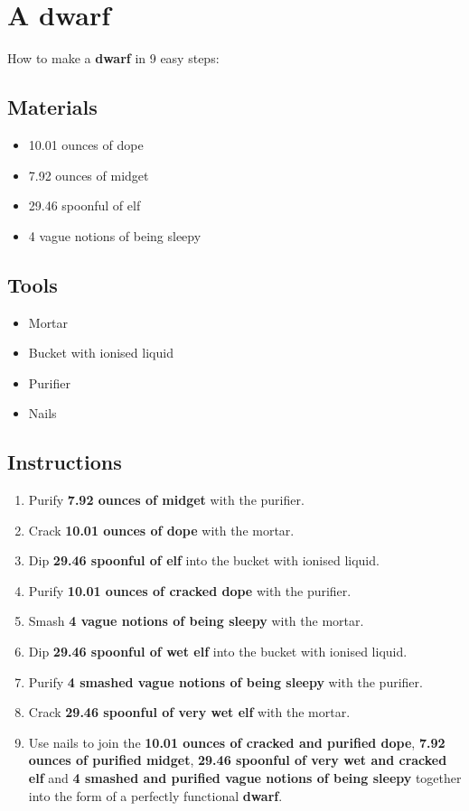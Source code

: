 \documentclass{article}
\begin{document}
\section{A dwarf}How to make a \textbf{dwarf} in 9 easy steps:

\subsection{Materials}\begin{itemize}
\item 
10.01 ounces of dope
\item 
7.92 ounces of midget
\item 
29.46 spoonful of elf
\item 
4 vague notions of being sleepy
\end{itemize}
\subsection{Tools}\begin{itemize}
\item 
Mortar
\item 
Bucket with ionised liquid
\item 
Purifier
\item 
Nails
\end{itemize}
\subsection{Instructions}\begin{enumerate}
\item 
Purify \textbf{7.92 ounces of midget} with the purifier.
\item 
Crack \textbf{10.01 ounces of dope} with the mortar.
\item 
Dip \textbf{29.46 spoonful of elf} into the bucket with ionised liquid.
\item 
Purify \textbf{10.01 ounces of cracked dope} with the purifier.
\item 
Smash \textbf{4 vague notions of being sleepy} with the mortar.
\item 
Dip \textbf{29.46 spoonful of wet elf} into the bucket with ionised liquid.
\item 
Purify \textbf{4 smashed vague notions of being sleepy} with the purifier.
\item 
Crack \textbf{29.46 spoonful of very wet elf} with the mortar.
\item 
Use nails to join the \textbf{10.01 ounces of cracked and purified dope}, \textbf{7.92 ounces of purified midget}, \textbf{29.46 spoonful of very wet and cracked elf} and \textbf{4 smashed and purified vague notions of being sleepy} together into the form of a perfectly functional \textbf{dwarf}.
\end{enumerate}
\newpage
\end{document}
